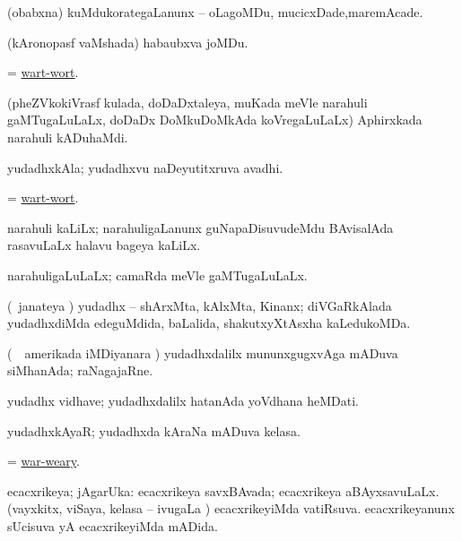 \noindent 
\gl{\pagu}
\expl{}
\bmng
{} (obabxna) kuMdukorategaLanunx -- oLagoMDu, mucicxDade,maremAcade. 
\emng
\eentry

\bentry
{} 
\gl{\nA}
\expl{}
\bmng
(kAronopasf vaMshada) habaubxva joMDu. 
\emng
\eentry

\bentry
{} 
\gl{\nA}
\expl{}
\bmng
= \hyperlink{wart-wort}{wart-wort}. 
\emng
\eentry

\bentry
{} 
\gl{\nA}
\expl{}
\bmng
(pheZVkokiVrasf kulada, doDaDxtaleya, muKada meVle narahuli gaMTugaLuLaLx, doDaDx DoMkuDoMkAda koVregaLuLaLx) Aphirxkada narahuli kADuhaMdi.  
\emng
\eentry

\bentry
{} 
\gl{\nA}
\expl{}
\bmng
yudadhxkAla; yudadhxvu naDeyutitxruva avadhi. 
\emng
\eentry

\bentry
{} 
\gl{\nA}
\expl{}
\bmng
= \hyperlink{wart-wort}{wart-wort}. 
\emng
\eentry

\bentry
{} 
\gl{\nA}
\expl{}
\bmng
narahuli kaLiLx; narahuligaLanunx guNapaDisuvudeMdu BAvisalAda rasavuLaLx halavu bageya kaLiLx. 
\emng
\eentry

\bentry
{} 
\gl{\gu}
\expl{}
\bmng
narahuligaLuLaLx; camaRda meVle gaMTugaLuLaLx. 
\emng
\eentry

\bentry
{} 
\gl{\gu}
\expl{}
\bmng
(\kanmu\ janateya \vi) yudadhx -- shArxMta, kAlxMta, Kinanx; diVGaRkAlada yudadhxdiMda edeguMdida, baLalida, shakutxyXtAsxha kaLedukoMDa. 
\emng
\eentry

\bentry
{} 
\gl{\nA}
\expl{}
\bmng
(\kanmu\ \kanu\ amerikada iMDiyanara \vi) yudadhxdalilx mununxgugxvAga mADuva siMhanAda; raNagajaRne. 
\emng
\eentry

\bentry
{} 
\gl{\nA}
\expl{}
\bmng
yudadhx vidhave; yudadhxdalilx hatanAda yoVdhana heMDati. 
\emng
\eentry

\bentry
{} 
\gl{\nA}
\expl{}
\bmng
yudadhxkAyaR; yudadhxda kAraNa mADuva kelasa. 
\emng
\eentry

\bentry
{} 
\gl{\gu}
\expl{}
\bmng
= \hyperlink{war-weary}{war-weary}. 
\emng
\eentry

\bentry
{} 
\gl{\gu}
\bmng
ecacxrikeya; jAgarUka: 
\banum
{} ecacxrikeya savxBAvada; ecacxrikeya aBAyxsavuLaLx. 
 (vayxkitx, viSaya, kelasa -- ivugaLa \vi) ecacxrikeyiMda vatiRsuva. 
 ecacxrikeyanunx sUcisuva yA ecacxrikeyiMda mADida. 
\eanum
\emng
\eentry

